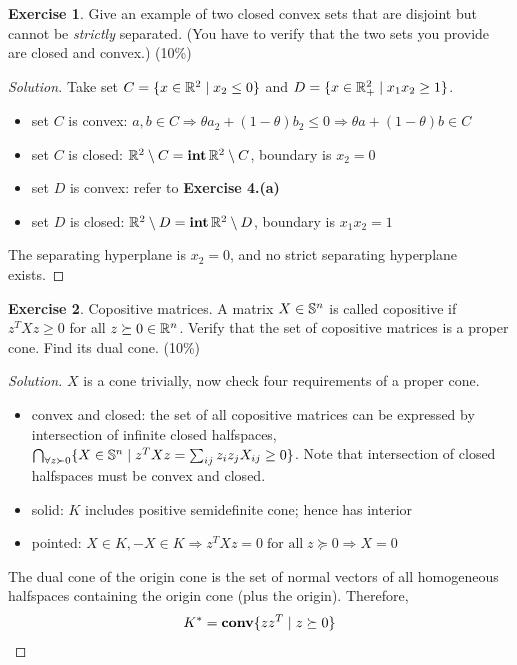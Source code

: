 \documentclass[12pt]{extarticle}
\theoremstyle{definition}
\newtheorem{exercise}{Exercise}
\begin{document}
\begin{exercise}
  Give an example of two closed convex sets that are disjoint but cannot be \textit{strictly} separated.
  (You have to verify that the two sets you provide are closed and convex.) (10\%)
\end{exercise}
\begin{proof}[Solution]
  \let\qed\relax
  Take set $C=\{x\in\mathbb{R}^2\mid x_2\le 0\}$ and $D=\{x\in\mathbb{R}_{+}^2\mid x_1x_2\ge 1\}$.
  \begin{itemize}
    \item set $C$ is convex: $a, b\in C\Rightarrow\theta a_2+(1-\theta)b_2\le 0\Rightarrow \theta a+(1-\theta)b\in C$
    \item set $C$ is closed: $\mathbb{R}^2\setminus C=\mathop{\bf int}\mathbb{R}^2\setminus C$, boundary is $x_2=0$
    \item set $D$ is convex: refer to \textbf{Exercise 4.(a)}
    \item set $D$ is closed: $\mathbb{R}^2\setminus D=\mathop{\bf int}\mathbb{R}^2\setminus D$, boundary is $x_1x_2=1$
  \end{itemize}
  The separating hyperplane is $x_2=0$, and no strict separating hyperplane exists.
\end{proof}

\begin{exercise}
  Copositive matrices. A matrix $X\in\mathbb{S}^n$ is called copositive if $z^TXz\ge 0$ for all $z\succeq 0\in\mathbb{R}^n$.
  Verify that the set of copositive matrices is a proper cone. Find its dual cone. (10\%)
\end{exercise}
\begin{proof}[Solution]
  \let\qed\relax
  $X$ is a cone trivially, now check four requirements of a proper cone.
  \begin{itemize}
    \item convex and closed: the set of all copositive matrices can be expressed by intersection of infinite closed halfspaces, \ie $\bigcap_{\forall z\succ 0}\{X\in\mathbb{S}^n\mid z^TXz=\sum_{ij}z_iz_jX_{ij}\ge 0\}$. Note that intersection of closed halfspaces must be convex and closed.
    \item solid: $K$ includes positive semidefinite cone; hence has interior
    \item pointed: $X\in K, -X\in K\Rightarrow z^TXz=0\;\text{for all}\;z\succeq 0\Rightarrow X=0$
  \end{itemize}
  The dual cone of the origin cone is the set of normal vectors of all homogeneous halfspaces containing the origin cone (plus the origin). Therefore,
  \begin{align*}
    K^\ast=\mathop{\bf conv}\{zz^T\mid z\succeq 0\}
  \end{align*}
\end{proof}
\end{document}
